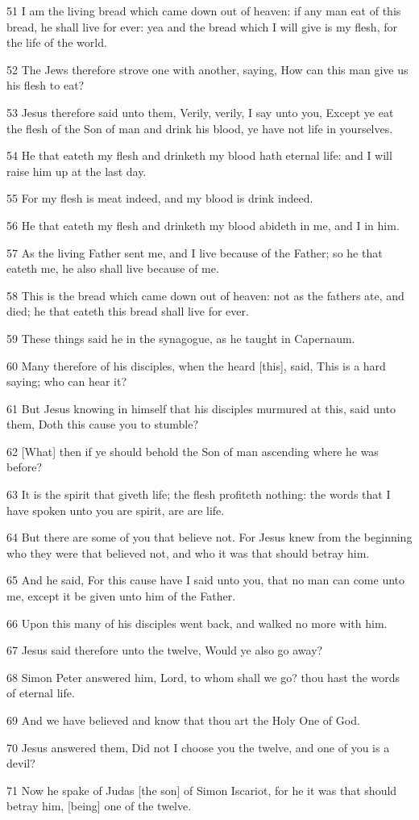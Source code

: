 \par 51 I am the living bread which came down out of heaven: if any man eat of this bread, he shall live for ever: yea and the bread which I will give is my flesh, for the life of the world.
\par 52 The Jews therefore strove one with another, saying, How can this man give us his flesh to eat?
\par 53 Jesus therefore said unto them, Verily, verily, I say unto you, Except ye eat the flesh of the Son of man and drink his blood, ye have not life in yourselves.
\par 54 He that eateth my flesh and drinketh my blood hath eternal life: and I will raise him up at the last day.
\par 55 For my flesh is meat indeed, and my blood is drink indeed.
\par 56 He that eateth my flesh and drinketh my blood abideth in me, and I in him.
\par 57 As the living Father sent me, and I live because of the Father; so he that eateth me, he also shall live because of me.
\par 58 This is the bread which came down out of heaven: not as the fathers ate, and died; he that eateth this bread shall live for ever.
\par 59 These things said he in the synagogue, as he taught in Capernaum.
\par 60 Many therefore of his disciples, when the heard [this], said, This is a hard saying; who can hear it?
\par 61 But Jesus knowing in himself that his disciples murmured at this, said unto them, Doth this cause you to stumble?
\par 62 [What] then if ye should behold the Son of man ascending where he was before?
\par 63 It is the spirit that giveth life; the flesh profiteth nothing: the words that I have spoken unto you are spirit, are are life.
\par 64 But there are some of you that believe not. For Jesus knew from the beginning who they were that believed not, and who it was that should betray him.
\par 65 And he said, For this cause have I said unto you, that no man can come unto me, except it be given unto him of the Father.
\par 66 Upon this many of his disciples went back, and walked no more with him.
\par 67 Jesus said therefore unto the twelve, Would ye also go away?
\par 68 Simon Peter answered him, Lord, to whom shall we go? thou hast the words of eternal life.
\par 69 And we have believed and know that thou art the Holy One of God.
\par 70 Jesus answered them, Did not I choose you the twelve, and one of you is a devil?
\par 71 Now he spake of Judas [the son] of Simon Iscariot, for he it was that should betray him, [being] one of the twelve.

